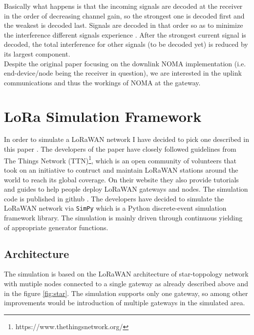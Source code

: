 Basically what happens is that the incoming signals are decoded at the receiver in the order of decreasing channel gain, so the  strongest one is decoded first and the weakest is decoded last. Signals are decoded in that order so as to minimize the interference different signals experience \cite{noma_imperial}. After the strongest current signal is decoded, the total interference for other signals (to be decoded yet) is reduced by its largest component.\\

Despite the original paper \cite{noma_original} focusing on the downlink NOMA
implementation (i.e. end-device/node being the receiver in question), we are interested in the uplink communications and thus the workings of NOMA at the gateway. 
  
 
 
\section{LoRa Simulation Framework}

In order to simulate a LoRaWAN network I have decided to pick one described in this paper \cite{simulator}. The developers of the paper have closely followed guidelines from The Things Network (TTN)\footnote{https://www.thethingsnetwork.org/}, which is an open community of volunteers that took on an initiative to contruct and maintain LoRaWAN stations around the world to reach its global coverage. On their website they also provide tutorials and guides to help people deploy LoRaWAN gateways and nodes. The simulation code is published in github \cite{simulator_github}. The developers have decided to simulate the LoRaWAN network via \texttt{SimPy} which is a Python discrete-event simulation framework library\cite{simpy}. The simulation is mainly driven through continuous yielding of appropriate generator functions. 

\subsection{Architecture}

The simulation is based on the LoRaWAN architecture of star-toppology network with mutiple nodes connected to a single gateway as already described above and in the figure \ref{fig:star}. The simulation supports only one gateway, so among other improvements would be introduction of multiple gateways in the simulated area. \\

